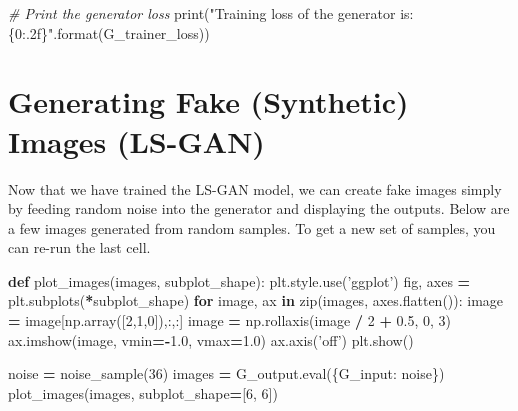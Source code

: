 \documentclass[]{book}
\newenvironment{Shaded}{\begin{snugshade}}{\end{snugshade}}
\newcommand{\KeywordTok}[1]{\textcolor[rgb]{0.13,0.29,0.53}{\textbf{#1}}}
\newcommand{\DecValTok}[1]{\textcolor[rgb]{0.00,0.00,0.81}{#1}}
\newcommand{\FloatTok}[1]{\textcolor[rgb]{0.00,0.00,0.81}{#1}}
\newcommand{\SpecialCharTok}[1]{\textcolor[rgb]{0.00,0.00,0.00}{#1}}
\newcommand{\StringTok}[1]{\textcolor[rgb]{0.31,0.60,0.02}{#1}}
\newcommand{\CommentTok}[1]{\textcolor[rgb]{0.56,0.35,0.01}{\textit{#1}}}
\newcommand{\ControlFlowTok}[1]{\textcolor[rgb]{0.13,0.29,0.53}{\textbf{#1}}}
\newcommand{\OperatorTok}[1]{\textcolor[rgb]{0.81,0.36,0.00}{\textbf{#1}}}
\newcommand{\BuiltInTok}[1]{#1}
\newcommand{\NormalTok}[1]{#1}
\theoremstyle{definition}
\theoremstyle{definition}
\theoremstyle{definition}
\theoremstyle{remark}
\begin{document}
\begin{Shaded}
\begin{Highlighting}[]
\CommentTok{# Print the generator loss }
\BuiltInTok{print}\NormalTok{(}\StringTok{"Training loss of the generator is: }\SpecialCharTok{\{0:.2f\}}\StringTok{"}\NormalTok{.}\BuiltInTok{format}\NormalTok{(G_trainer_loss))}
\end{Highlighting}
\end{Shaded}

\section{Generating Fake (Synthetic) Images
(LS-GAN)}\label{generating-fake-synthetic-images-ls-gan}

Now that we have trained the LS-GAN model, we can create fake images
simply by feeding random noise into the generator and displaying the
outputs. Below are a few images generated from random samples. To get a
new set of samples, you can re-run the last cell.

\begin{Shaded}
\begin{Highlighting}[]
\KeywordTok{def}\NormalTok{ plot_images(images, subplot_shape):}
\NormalTok{    plt.style.use(}\StringTok{'ggplot'}\NormalTok{)}
\NormalTok{    fig, axes }\OperatorTok{=}\NormalTok{ plt.subplots(}\OperatorTok{*}\NormalTok{subplot_shape)}
    \ControlFlowTok{for}\NormalTok{ image, ax }\KeywordTok{in} \BuiltInTok{zip}\NormalTok{(images, axes.flatten()):}
\NormalTok{        image }\OperatorTok{=}\NormalTok{ image[np.array([}\DecValTok{2}\NormalTok{,}\DecValTok{1}\NormalTok{,}\DecValTok{0}\NormalTok{]),:,:]}
\NormalTok{        image }\OperatorTok{=}\NormalTok{ np.rollaxis(image }\OperatorTok{/} \DecValTok{2} \OperatorTok{+} \FloatTok{0.5}\NormalTok{, }\DecValTok{0}\NormalTok{, }\DecValTok{3}\NormalTok{)}
\NormalTok{        ax.imshow(image, vmin}\OperatorTok{=-}\FloatTok{1.0}\NormalTok{, vmax}\OperatorTok{=}\FloatTok{1.0}\NormalTok{)}
\NormalTok{        ax.axis(}\StringTok{'off'}\NormalTok{)}
\NormalTok{    plt.show()}

\NormalTok{noise }\OperatorTok{=}\NormalTok{ noise_sample(}\DecValTok{36}\NormalTok{)}
\NormalTok{images }\OperatorTok{=}\NormalTok{ G_output.}\BuiltInTok{eval}\NormalTok{(\{G_input: noise\})}
\NormalTok{plot_images(images, subplot_shape}\OperatorTok{=}\NormalTok{[}\DecValTok{6}\NormalTok{, }\DecValTok{6}\NormalTok{])}
\end{Highlighting}
\end{Shaded}
\end{document}
